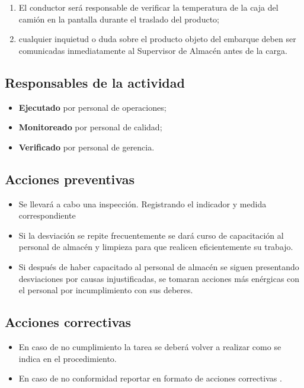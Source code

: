\begin{enumerate}
	\item El conductor será responsable de verificar la temperatura de la caja del camión en la pantalla durante el traslado del producto;
	\item cualquier inquietud o duda sobre el producto objeto del embarque deben ser comunicadas inmediatamente al Supervisor de Almacén antes de la carga.
\end{enumerate}

\subsection{Responsables de la actividad}

\begin{itemize}
	\item \textbf{Ejecutado} por personal de operaciones;
	\item \textbf{Monitoreado} por personal de calidad;
	\item \textbf{Verificado} por personal de gerencia.
\end{itemize}

\subsection{Acciones preventivas}

\begin{itemize}
	\item Se llevará a cabo una inspección. Registrando el indicador y medida correspondiente
	\item Si la desviación se repite frecuentemente se dará curso de capacitación al personal de almacén y limpieza para que realicen eficientemente su trabajo.
	\item Si después de haber capacitado al personal de almacén se siguen presentando desviaciones por causas injustificadas, se tomaran acciones más enérgicas con el personal por incumplimiento con sus deberes.
\end{itemize}

\subsection{Acciones correctivas}

\begin{itemize}
	\item En caso de no cumplimiento la tarea se deberá volver a realizar como se indica en el procedimiento.
	\item En caso de no conformidad reportar en formato de acciones correctivas \RAC.
\end{itemize}

